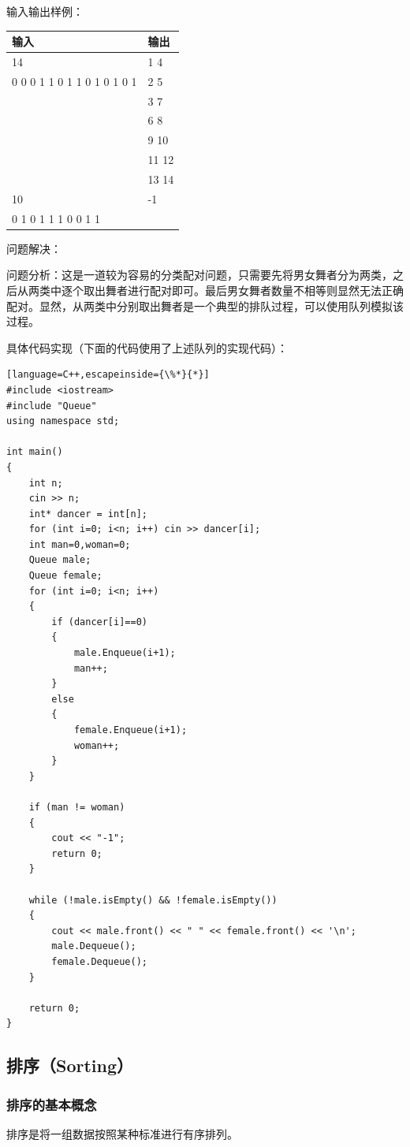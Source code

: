 \documentclass[UTF8]{ctexart}
\begin{document}
输入输出样例：

\begin{tabular}{|l|l|}
	\hline
	输入 & 输出 \\
	\hline
	14 & 1 4 \\
	0 0 0 1 1 0 1 1 0 1 0 1 0 1 & 2 5 \\
	 & 3 7 \\
	 & 6 8 \\
	 & 9 10 \\
	 & 11 12 \\
	 & 13 14 \\
	\hline
	10 & -1 \\
	0 1 0 1 1 1 0 0 1 1 &  \\
	\hline
	\end{tabular}

问题解决：

问题分析：这是一道较为容易的分类配对问题，只需要先将男女舞者分为两类，之后从两类中逐个取出舞者进行配对即可。最后男女舞者数量不相等则显然无法正确配对。显然，从两类中分别取出舞者是一个典型的排队过程，可以使用队列模拟该过程。

具体代码实现（下面的代码使用了上述队列的实现代码）：
\begin{lstlisting}[language=C++,escapeinside={\%*}{*}]
#include <iostream>
#include "Queue"
using namespace std;

int main()
{
	int n;
	cin >> n;
	int* dancer = int[n];
	for (int i=0; i<n; i++) cin >> dancer[i];
	int man=0,woman=0;
	Queue male;
	Queue female;
	for (int i=0; i<n; i++)
	{
		if (dancer[i]==0) 
		{
			male.Enqueue(i+1);
			man++;
		}
		else 
		{
			female.Enqueue(i+1);
			woman++;
		}
	}
	
	if (man != woman)
	{
		cout << "-1";
		return 0;
	}
	
	while (!male.isEmpty() && !female.isEmpty())
	{
		cout << male.front() << " " << female.front() << '\n';
		male.Dequeue();
		female.Dequeue();
	}
	
	return 0;
}

\end{lstlisting}
\subsection{排序（Sorting）}
\subsubsection{排序的基本概念}
排序是将一组数据按照某种标准进行有序排列。
\end{document}
